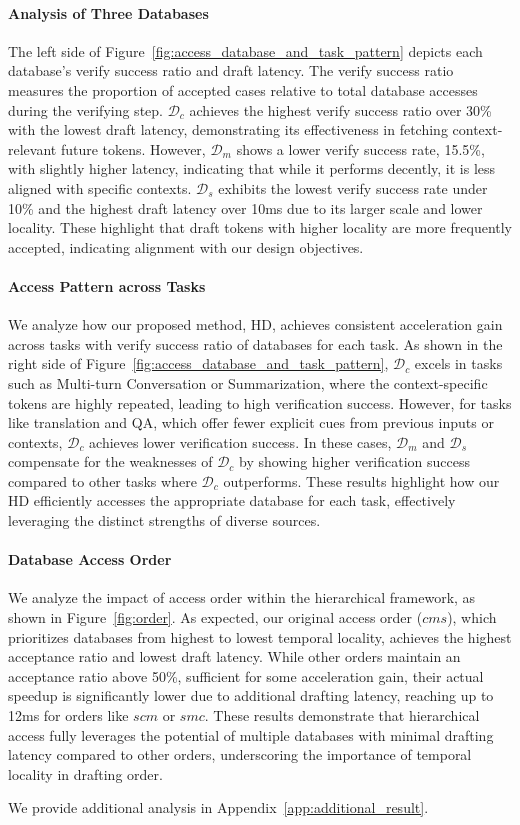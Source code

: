 \paragraph{Analysis of Three Databases}
The left side of Figure~\ref{fig:access_database_and_task_pattern} depicts each database's verify success ratio and draft latency. 
The verify success ratio measures the proportion of accepted cases relative to total database accesses during the verifying step.
$\mathcal{D}_c$ achieves the highest verify success ratio over 30\% with the lowest draft latency, demonstrating its effectiveness in fetching context-relevant future tokens. However, $\mathcal{D}_m$ shows a lower verify success rate, 15.5\%, with slightly higher latency, indicating that while it performs decently, it is less aligned with specific contexts. $\mathcal{D}_s$ exhibits the lowest verify success rate under 10\% and the highest draft latency over 10ms due to its larger scale and lower locality. These highlight that draft tokens with higher locality are more frequently accepted, indicating alignment with our design objectives.


\paragraph{Access Pattern across Tasks}
We analyze how our proposed method, HD, achieves consistent acceleration gain across tasks with verify success ratio of databases for each task.
As shown in the right side of Figure~\ref{fig:access_database_and_task_pattern}, $\mathcal{D}_c$ excels in tasks such as Multi-turn Conversation or Summarization, where the context-specific tokens are highly repeated, leading to high verification success. However, for tasks like translation and QA, which offer fewer explicit cues from previous inputs or contexts, $\mathcal{D}_c$ achieves lower verification success. 
In these cases, $\mathcal{D}_m$ and $\mathcal{D}_s$ compensate for the weaknesses of $\mathcal{D}_c$ by showing higher verification success compared to other tasks where $\mathcal{D}_c$ outperforms.
These results highlight how our HD efficiently accesses the appropriate database for each task, effectively leveraging the distinct strengths of diverse sources.


\paragraph{Database Access Order}
We analyze the impact of access order within the hierarchical framework, as shown in Figure~\ref{fig:order}. 
As expected, our original access order ($cms$), which prioritizes databases from highest to lowest temporal locality, achieves the highest acceptance ratio and lowest draft latency. 
While other orders maintain an acceptance ratio above 50\%, sufficient for some acceleration gain, their actual speedup is significantly lower due to additional drafting latency, reaching up to 12ms for orders like $scm$ or $smc$.
These results demonstrate that hierarchical access fully leverages the potential of multiple databases with minimal drafting latency compared to other orders, underscoring the importance of temporal locality in drafting order.

We provide additional analysis in Appendix~\ref{app:additional_result}.